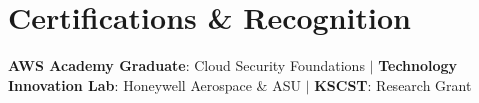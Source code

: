 \documentclass[letterpaper,11pt]{article}
\begin{document}
\section{Certifications \& Recognition}
 \begin{itemize}[leftmargin=0.15in, label={}]
    \small{\item{
     \textbf{AWS Academy Graduate}{: Cloud Security Foundations} $|$
     \textbf{Technology Innovation Lab}{: Honeywell Aerospace \& ASU} $|$
     \textbf{KSCST}{: Research Grant}
    }}
 \end{itemize}

\end{document}

